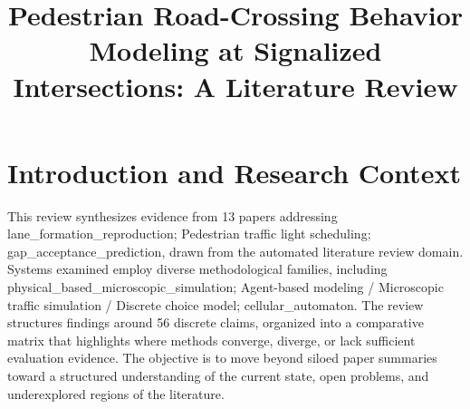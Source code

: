\documentclass{article}
\title{Pedestrian Road-Crossing Behavior Modeling at Signalized Intersections: A Literature Review}
\begin{document}
\maketitle
\section{Introduction and Research Context}
This review synthesizes evidence from 13 papers addressing lane_formation_reproduction; Pedestrian traffic light scheduling; gap_acceptance_prediction, drawn from the automated literature review domain. Systems examined employ diverse methodological families, including physical_based_microscopic_simulation; Agent-based modeling / Microscopic traffic simulation / Discrete choice model; cellular_automaton. The review structures findings around 56 discrete claims, organized into a comparative matrix that highlights where methods converge, diverge, or lack sufficient evaluation evidence. The objective is to move beyond siloed paper summaries toward a structured understanding of the current state, open problems, and underexplored regions of the literature.
\end{document}
